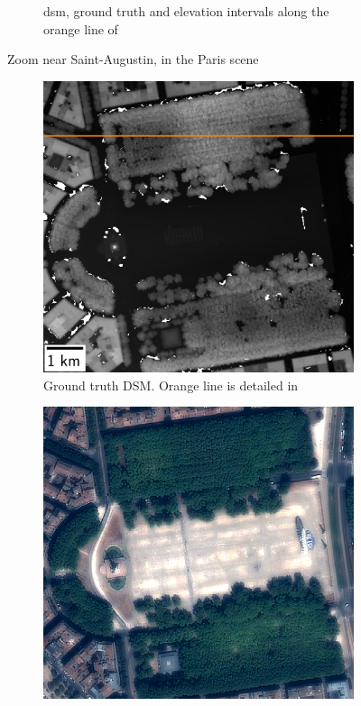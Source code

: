 \begin{figure}
\begin{subfigure}[t]{\linewidth}
        \caption{\acrshort{dsm}, ground truth and elevation intervals along the orange line of }
        \label{fig:paris_error_tree_line}
    \end{subfigure}
    \caption{Zoom near Saint-Augustin, in the Paris scene}
    \label{fig:paris_error_tree}
\end{figure}

\begin{figure}
    \begin{subfigure}[t]{0.33\linewidth}
        \flushleft
        \includegraphics[width=\linewidth]{Images/Chap_6/Bordeaux_gt_zoom.png}
        \caption{Ground truth DSM. Orange line is detailed in }
        \label{fig:Bordeaux_gt}
    \end{subfigure}\hfill
    \begin{subfigure}[t]{0.33\linewidth}
        \centering
        \includegraphics[width=\linewidth]{Images/Chap_6/Bordeaux_clr_zoom.png}

\end{subfigure}
\end{figure}
